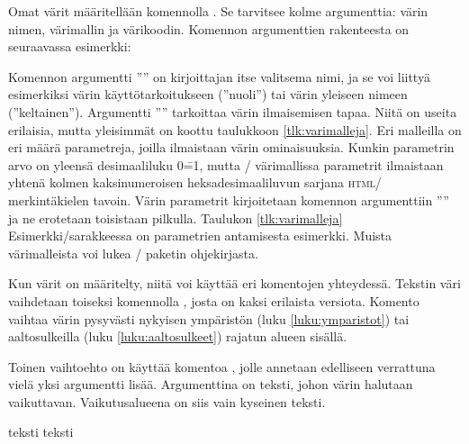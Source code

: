 Omat värit määritellään komennolla . Se tarvitsee
kolme argumenttia: värin nimen, värimallin ja värikoodin. Komennon
argumenttien rakenteesta on seuraavassa esimerkki:

\begin{koodilohkosis}
\end{koodilohkosis}

Komennon argumentti '''' on kirjoittajan itse valitsema
nimi, ja se voi liittyä esimerkiksi värin käyttötarkoitukseen
(''nuoli'') tai värin yleiseen nimeen (''keltainen''). Argumentti
'''' tarkoittaa värin ilmaisemisen tapaa. Niitä on
useita erilaisia, mutta yleisimmät on koottu taulukkoon
\ref{tlk:varimalleja}. Eri malleilla on eri määrä parametreja, joilla
ilmaistaan värin ominaisuuksia. Kunkin parametrin arvo on yleensä
desimaaliluku 0\==1, mutta \-/ värimallissa parametrit
ilmaistaan yhtenä kolmen kaksinumeroisen heksadesimaaliluvun sarjana
\textsc{html}\-/ merkintäkielen tavoin. Värin parametrit kirjoitetaan
komennon argumenttiin '''' ja ne erotetaan
toisistaan pilkulla. Taulukon \ref{tlk:varimalleja}
Esimerkki\-/sarakkeessa on parametrien antamisesta esimerkki. Muista
värimalleista voi lukea \-/ paketin ohjekirjasta.

Kun värit on määritelty, niitä voi käyttää eri komentojen yhteydessä.
Tekstin väri vaihdetaan toiseksi komennolla , josta on
kaksi erilaista versiota. Komento vaihtaa värin pysyvästi nykyisen
ympäristön (luku \ref{luku:ymparistot}) tai aaltosulkeilla (luku
\ref{luku:aaltosulkeet}) rajatun alueen sisällä.

\begin{koodilohkosis}
\color{nimi}                  %
\color[värimalli]{parametrit} %
\end{koodilohkosis}

Toinen vaihtoehto on käyttää komentoa , jolle
annetaan edelliseen verrattuna vielä yksi argumentti lisää. Argumenttina
on teksti, johon värin halutaan vaikuttavan. Vaikutusalueena on siis
vain kyseinen teksti.

\begin{koodilohkosis}
\textcolor{nimi}{teksti}
\textcolor[värimalli]{parametrit}{teksti}
\end{koodilohkosis}

